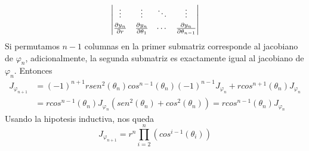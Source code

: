 \documentclass{article}
\begin{document}
\begin{enumerate}
\begin{equation*}
\begin{vmatrix}
            \vdots & \vdots & \ddots & \vdots \\[1mm]
            \frac{\partial y_{n}}{\partial r} & \frac{\partial y_{n}}{\partial\theta_{1}} & \cdots & \frac{\partial y_{n}}{\partial\theta_{n-1}}
        \end{vmatrix}
    \end{equation*}
    Si permutamos $n-1$ columnas en la primer submatriz corresponde al jacobiano de $\varphi_{n}$,
    adicionalmente, la segunda submatriz es exactamente igual al jacobiano de $\varphi_{n}$. 
    Entonces
    \begin{align*}
        J_{\varphi_{n+1}} &= (-1)^{n+1}rsen^{2}(\theta_{n})cos^{n-1}(\theta_{n})(-1)^{n-1}
        J_{\varphi_{n}}+rcos^{n+1}(\theta_{n})J_{\varphi_{n}} \\[2mm]
        &= rcos^{n-1}(\theta_{n})J_{\varphi_{n}}(sen^{2}(\theta_{n})+cos^{2}(\theta_{n}))
        =rcos^{n-1}(\theta_{n})J_{\varphi_{n}}
    \end{align*}
    Usando la hipotesis inductiva, nos queda
    \begin{equation*}
        J_{\varphi_{n+1}}=r^{n}\prod_{i=2}^{n}(cos^{i-1}(\theta_{i}))
    \end{equation*}
    

\end{enumerate}
\end{document}
